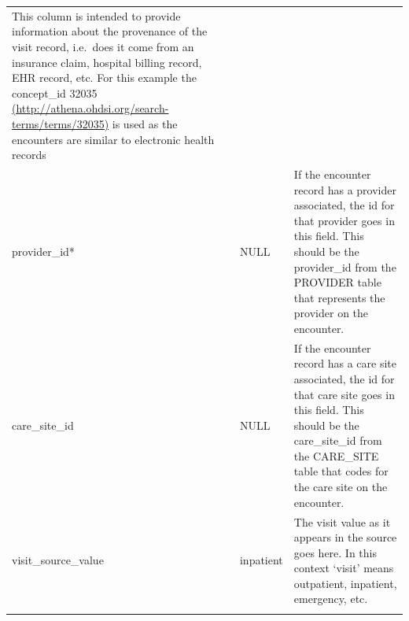 \documentclass[]{book}
\begin{document}
\begin{longtable}[]{@{}lll@{}}
\begin{minipage}[t]{0.49\columnwidth}
This column is intended to provide information about the provenance of
the visit record, i.e.~does it come from an insurance claim, hospital
billing record, EHR record, etc. For this example the concept\_id 32035
\href{http://athena.ohdsi.org/search-terms/terms/32035}{(http://athena.ohdsi.org/search-terms/terms/32035)}
is used as the encounters are similar to electronic health records\strut
\end{minipage}\tabularnewline
\begin{minipage}[t]{0.25\columnwidth}\raggedright\strut
provider\_id*\strut
\end{minipage} & \begin{minipage}[t]{0.17\columnwidth}\raggedright\strut
NULL\strut
\end{minipage} & \begin{minipage}[t]{0.49\columnwidth}\raggedright\strut
If the encounter record has a provider associated, the id for that
provider goes in this field. This should be the provider\_id from the
PROVIDER table that represents the provider on the encounter.\strut
\end{minipage}\tabularnewline
\begin{minipage}[t]{0.25\columnwidth}\raggedright\strut
care\_site\_id\strut
\end{minipage} & \begin{minipage}[t]{0.17\columnwidth}\raggedright\strut
NULL\strut
\end{minipage} & \begin{minipage}[t]{0.49\columnwidth}\raggedright\strut
If the encounter record has a care site associated, the id for that care
site goes in this field. This should be the care\_site\_id from the
CARE\_SITE table that codes for the care site on the encounter.\strut
\end{minipage}\tabularnewline
\begin{minipage}[t]{0.25\columnwidth}\raggedright\strut
visit\_source\_value\strut
\end{minipage} & \begin{minipage}[t]{0.17\columnwidth}\raggedright\strut
inpatient\strut
\end{minipage} & \begin{minipage}[t]{0.49\columnwidth}\raggedright\strut
The visit value as it appears in the source goes here. In this context
`visit' means outpatient, inpatient, emergency, etc.\strut
\end{minipage}\tabularnewline
\begin{minipage}[t]{0.25\columnwidth}\raggedright\strut

\end{minipage}
\end{longtable}
\end{document}
